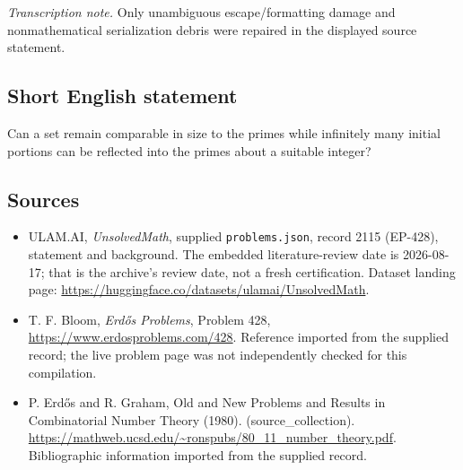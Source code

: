 \documentclass[11pt,a4paper]{article}
\begin{document}
{\small\emph{Transcription note.} Only unambiguous escape/formatting damage and nonmathematical serialization debris were repaired in the displayed source statement.}

\subsection{Short English statement}

Can a set remain comparable in size to the primes while infinitely many initial portions can be reflected into the primes about a suitable integer?

\subsection{Sources}

{\small

\begin{itemize}

\item[\hypertarget{source:2115:1}{S1}] ULAM.AI, \emph{UnsolvedMath}, supplied \texttt{problems.json}, record 2115 (EP-428), statement and background. The embedded literature-review date is 2026-08-17; that is the archive’s review date, not a fresh certification. Dataset landing page: \url{https://huggingface.co/datasets/ulamai/UnsolvedMath}.

\item[\hypertarget{source:2115:2}{S2}] T. F. Bloom, \emph{Erdős Problems}, Problem 428, \url{https://www.erdosproblems.com/428}. Reference imported from the supplied record; the live problem page was not independently checked for this compilation.

\item[\hypertarget{source:2115:3}{S3}] P. Erdős and R. Graham, Old and New Problems and Results in Combinatorial Number Theory (1980). (source\_collection). \url{https://mathweb.ucsd.edu/~ronspubs/80_11_number_theory.pdf}. Bibliographic information imported from the supplied record.

\end{itemize}

}

\label{end:2115}
\end{document}
